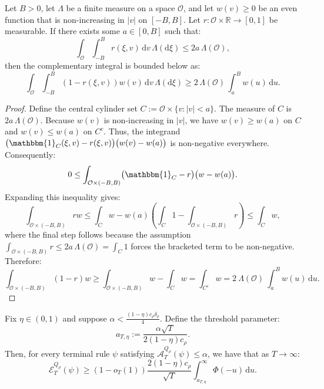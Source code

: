 \documentclass[10pt]{article}
\newcommand{\dd}{\mathrm{d}}
\theoremstyle{plain}
\begin{document}
\begin{lemma}
\label{lem:flat-rearrangement}
Let $B>0$, let $\Lambda$ be a finite measure on a space $\mathcal{O}$, and let $w(v)\geq0$ be an even function that is non-increasing in $|v|$ on $[-B,B]$. Let $r:\mathcal{O} \times \mathbb{R} \to [0,1]$ be measurable. If there exists some $a\in[0,B]$ such that:
$$ \int_{\mathcal{O}}\int_{-B}^{B}r(\xi,v)\,\dd v\,\Lambda(\dd\xi) \le 2a\,\Lambda(\mathcal{O}), $$
then the complementary integral is bounded below as:
$$ \int_{\mathcal{O}}\int_{-B}^{B} (1-r(\xi,v))w(v)\,\dd v\,\Lambda(\dd\xi) \ge 2\,\Lambda(\mathcal{O})\,\int_a^B w(u)\,\dd u. $$
\end{lemma}
\begin{proof}
Define the central cylinder set $C:=\mathcal{O}\times\{v:|v|<a\}$. The measure of $C$ is $2a\,\Lambda(\mathcal{O})$.
Because $w(v)$ is non-increasing in $|v|$, we have $w(v)\ge w(a)$ on $C$ and $w(v)\le w(a)$ on $C^c$. Thus, the integrand $\bigl(\mathbbm{1}_C(\xi,v)-r(\xi,v)\bigr)\bigl(w(v)-w(a)\bigr)$ is  non-negative everywhere. Consequently:
$$ 0 \le \int_{ \mathcal{O}\times (-B,B) } \bigl(\mathbbm{1}_C-r\bigr)\bigl(w-w(a)\bigr). $$
Expanding this inequality gives:
$$ \int_{ \mathcal{O}\times (-B,B) } r w \le \int_C w - w(a)\left( \int_C 1 - \int_{ \mathcal{O}\times (-B,B) } r \right) \le \int_C w, $$
where the final step follows because the assumption $\int_{ \mathcal{O}\times (-B,B) } r \le 2a\,\Lambda(\mathcal{O}) = \int_C 1$ forces the bracketed term to be non-negative. Therefore:
$$ \int_{ \mathcal{O}\times (-B,B) } (1-r)w \ge \int_{ \mathcal{O}\times (-B,B) } w - \int_C w = \int_{C^c} w = 2\ \Lambda(\mathcal{O})\ \int_a^B w(u)\,\dd u.  $$
\end{proof}

\begin{lemma}
\label{lem:flat-sign-lower-detailed}
Fix $\eta\in(0,1)$ and suppose $\alpha < \frac{(1-\eta)c_\rho\delta_{\rho}}{4}$. Define the threshold parameter:
\begin{equation}
a_{T,\eta} := \frac{\alpha\sqrt{T}}{2(1-\eta)c_\rho}. \label{eqn:aTeta}
\end{equation}
Then, for every terminal rule $\psi$ satisfying $\mathcal{A}_T^{Q_\rho}(\psi) \le \alpha$, we have that as $T\to\infty$:
$$ \mathcal{E}_T^{Q_\rho}(\psi) \ge (1-o_T(1)) \frac{2(1-\eta)c_\rho}{\sqrt{T}} \int_{a_{T,\eta}}^\infty \Phi(-u)\,\dd u. $$
\end{lemma}
\end{document}
